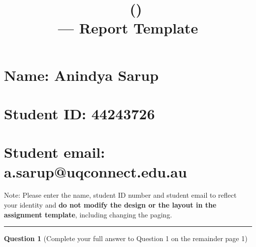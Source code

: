 \documentclass[11pt,a4paper,noindent]{article}
\title{\CourseCode\ \CourseName\ (\Session)\\
\Title --- \textbf{Report Template}}
\date{} %
\begin{document}
\maketitle
\vspace{-30mm}


\section*{Name: Anindya Sarup%
}
\section*{Student ID: 44243726%
}
\section*{Student email: a.sarup@uqconnect.edu.au%
}

\noindent
Note: Please enter the name, student ID number and student email to reflect your identity and \textbf{do not modify the design or the layout in the assignment template}, including changing the paging. 

\medskip\hrule

\bigskip \noindent
\textbf{Question 1} (Complete your full answer to Question 1 on the remainder page 1)
\end{document}
